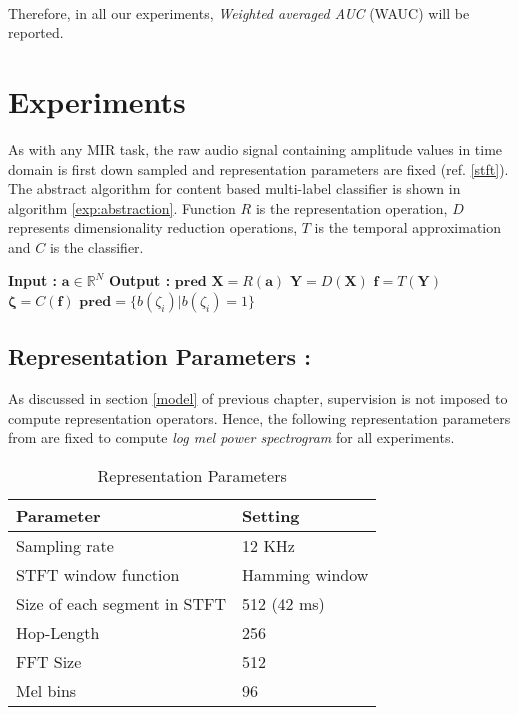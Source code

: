 \\
Therefore, in all our experiments, \textit{Weighted averaged AUC} (WAUC) will be reported.

\section{Experiments}
\label{experiments}
 
As with any MIR task, the raw audio signal containing amplitude values in time domain is first down sampled and representation parameters are fixed (ref. \ref{stft}). The abstract algorithm for content based multi-label classifier is shown in algorithm \ref{exp:abstraction}. Function $R$ is the representation operation, $D$ represents dimensionality reduction operations, $T$ is the temporal approximation and $C$ is the classifier. 
 
\begin{algorithm}
  \caption{$\textbf{pred}$ = $Model$($\textbf{a}$) }\label{exp:abstraction}
  \begin{algorithmic}[1]
    \Statex \textbf{Input :} $\textbf{a} \in \mathbb{R}^{N}$
    \Statex \textbf{Output :} $\textbf{pred}$ 
    \State $\textbf{X} = R(\textbf{a})$ 
    \State $\textbf{Y} = D(\textbf{X})$ 
    \State $\textbf{f} = T(\textbf{Y})$ 
    \State $\bm{\zeta} = C(\textbf{f})$ 
    \State $\textbf{pred} = \{ b(\zeta_{i}) | b(\zeta_{i}) = 1 \}$ 
  \end{algorithmic}
\end{algorithm}
\FloatBarrier

\subsection{Representation Parameters :}
\label{repPara}
As discussed in section \ref{model} of previous chapter, supervision is not imposed to compute representation operators. Hence, the following  representation parameters from \cite{choi_cnn} are fixed to compute \textit{log mel power spectrogram} for all experiments. 

\begin{table}[H]
\label{tab:repPara}
\centering
\begin{tabular}{| p{} | p{}|}
\hline
\textbf{Parameter} & \textbf{Setting}\\
\hline
Sampling rate & 12 KHz\\
\hline
STFT window function & Hamming window\\
\hline
Size of each segment in STFT & 512 (42 ms)\\
\hline
Hop-Length & 256\\
\hline
FFT Size & 512\\
\hline
Mel bins & 96\\
\hline
\end{tabular}
\caption{Representation Parameters} 
\end{table}
\FloatBarrier

